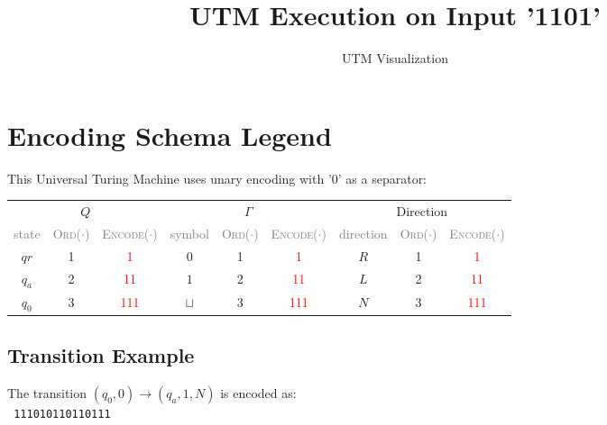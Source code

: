 \documentclass{article}
\begin{document}
\title{ UTM Execution on Input '1101' }
\author{UTM Visualization}
\maketitle

\section{Encoding Schema Legend}
This Universal Turing Machine uses unary encoding with '0' as a separator:

\begin{table}[h!]
    \centering
    \renewcommand{\arraystretch}{1.3}  %
    \begin{tabular}{|ccc|ccc|ccc|}
        \hline
        \multicolumn{3}{|c|}{$Q$} & 
        \multicolumn{3}{c|}{$\Gamma$} & 
        \multicolumn{3}{c|}{Direction}\\
        \multicolumn{1}{|c}{\textcolor{gray}{state}} & 
        \multicolumn{1}{c}{\textcolor{gray}{\textsc{Ord}($\cdot$)}} & 
        \multicolumn{1}{c|}{\textcolor{gray}{\textsc{Encode}($\cdot$)}} & 
        \multicolumn{1}{c}{\textcolor{gray}{symbol}} & 
        \multicolumn{1}{c}{\textcolor{gray}{\textsc{Ord}($\cdot$)}} & 
        \multicolumn{1}{c|}{\textcolor{gray}{\textsc{Encode}($\cdot$)}} & 
        \multicolumn{1}{c}{\textcolor{gray}{direction}} & 
        \multicolumn{1}{c}{\textcolor{gray}{\textsc{Ord}($\cdot$)}} & 
        \multicolumn{1}{c|}{\textcolor{gray}{\textsc{Encode}($\cdot$)}} \\
        \hline
        $qr$ & 1 & \textcolor{red}{ 1 } &
        $0$ & 1 & \textcolor{red}{ 1 } &
        $R$ & 1 & \textcolor{red}{ 1 } \\
        $q_a$ & 2 & \textcolor{red}{ 11 } &
        $1$ & 2 & \textcolor{red}{ 11 } &
        $L$ & 2 & \textcolor{red}{ 11 } \\
        $q_0$ & 3 & \textcolor{red}{ 111 } &
        $\sqcup$ & 3 & \textcolor{red}{ 111 } &
        $N$ & 3 & \textcolor{red}{ 111 } \\
        
        \hline
    \end{tabular}
\end{table}

\subsection*{Transition Example}
The transition $(q_0, 0) \rightarrow (q_a, 1, N)$ is encoded as:\\
\texttt{ 111010110110111 }
\end{document}
